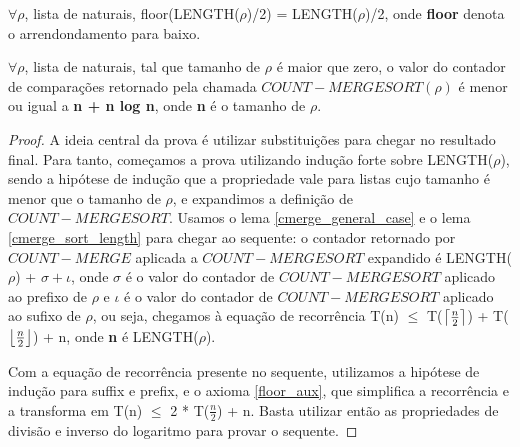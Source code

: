 \begin{axiom}
  \label{floor_aux}
  $\forall \rho$, lista de naturais, floor(LENGTH($\rho$)/2) 
  = LENGTH($\rho$)/2, onde
  \textbf{floor} denota o arrendondamento para baixo. 
\end{axiom}

\begin{lemma}
  \label{merge_sort_ws}
  $\forall \rho$, lista de naturais, tal que tamanho de $\rho$ é maior
  que zero, o valor do contador de comparações retornado pela chamada 
  $COUNT-MERGESORT(\rho)$ é menor ou igual a \textbf{n + n log n}, onde
  \textbf{n} é o tamanho de $\rho$.
\end{lemma}

\begin{proof}
  A ideia central da prova é utilizar substituições para
  chegar no resultado final. Para tanto, começamos a prova utilizando
  indução forte sobre LENGTH($\rho$), sendo a hipótese de indução
  que a propriedade vale para listas cujo tamanho é menor que o tamanho
  de $\rho$, e expandimos a definição de $COUNT-MERGESORT$. 
  Usamos o lema \ref{cmerge_general_case} e o lema \ref{cmerge_sort_length}
  para chegar ao sequente: o contador retornado por $COUNT-MERGE$ 
  aplicada a $COUNT-MERGESORT$ expandido é LENGTH($\rho$) + 
  $\sigma + \iota$, onde $\sigma$ é o valor do contador de $COUNT-MERGESORT$
  aplicado ao prefixo de $\rho$ e $\iota$ é o valor do contador de $COUNT-MERGESORT$
  aplicado ao sufixo de $\rho$, ou seja, chegamos à equação de recorrência
  T(n) $\le$ T($\left\lceil \frac{n}{2} \right\rceil$) + T($\left\lfloor \frac{n}{2} \right\rfloor$) + n, onde \textbf{n}
  é LENGTH($\rho$).

  Com a equação de recorrência presente no sequente, utilizamos a hipótese 
  de indução para suffix e prefix, e o axioma \ref{floor_aux}, 
  que simplifica a recorrência e a transforma em T(n) $\le$ 
  2 * T($\frac{n}{2}$) + n. Basta utilizar então as propriedades de
  divisão e inverso do logaritmo para provar o sequente.
\end{proof}